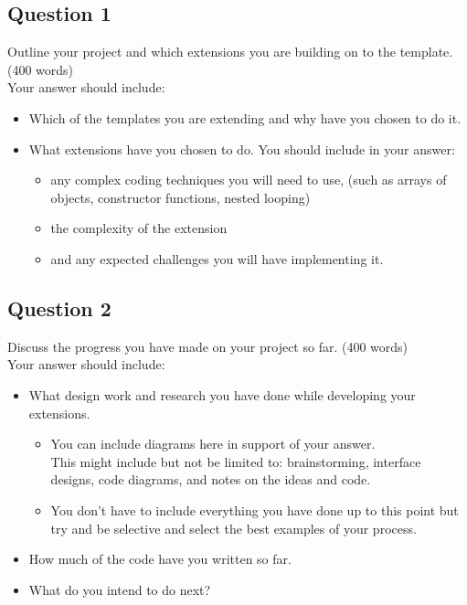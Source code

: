 \subsection*{Question 1}
Outline your project and which extensions you are building on to the template. (400 words)\\
Your answer should include:
\begin{itemize}
  \item Which of the templates you are extending and why have you chosen to do it.
  \item What extensions have you chosen to do. You should include in your answer:
    \begin{itemize}
      \item any complex coding techniques you will need to use,
(such as arrays of objects, constructor functions, nested looping)
        \item the complexity of the extension
        \item and any expected challenges you will have implementing it.
    \end{itemize}
\end{itemize}

\subsection*{Question 2}
Discuss the progress you have made on your project so far. (400 words)\\
Your answer should include:
\begin{itemize}
  \item What design work and research you have done while developing your extensions.
    \begin{itemize}
  \item You can include diagrams here in support of your answer. \\This might include but not be limited to: brainstorming, interface designs, code diagrams, and notes on the ideas and code.
  \item You don’t have to include everything you have done up to this point but try and be selective and select the best examples of your process.
\end{itemize}
  \item How much of the code have you written so far.
  \item What do you intend to do next?
\end{itemize}

